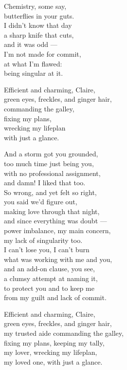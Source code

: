 \begin{lyrics}
Chemistry, some say,\\
butterflies in your guts.\\
I didn't know that day\\
a sharp knife that cuts,\\
and it was odd —\\
I'm not made for commit,\\
at what I'm flawed:\\
being singular at it.

Efficient and charming, Claire,\\
green eyes, freckles, and ginger hair,\\
commanding the galley,\\
fixing my plans,\\
wrecking my lifeplan\\
with just a glance.

And a storm got you grounded,\\
too much time just being you,\\
with no professional assignment,\\
and damn! I liked that too.\\
So wrong, and yet felt so right,\\
you said we'd figure out,\\
making love through that night,\\
and since everything was doubt —\\
power imbalance, my main concern,\\
my lack of singularity too.\\
I can't lose you, I can't burn\\
what was working with me and you,\\
and an add-on clause, you see,\\
a clumsy attempt at naming it,\\
to protect you and to keep me\\
from my guilt and lack of commit.

Efficient and charming, Claire,\\
green eyes, freckles, and ginger hair,\\
my trusted aide commanding the galley,\\
fixing my plans, keeping my tally,\\
my lover, wrecking my lifeplan,\\
my loved one, with just a glance.
\end{lyrics}
